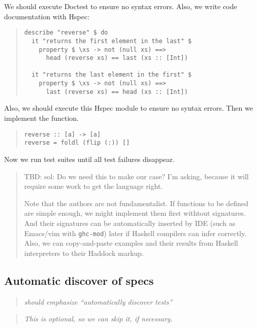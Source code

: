 \documentclass[preprint]{sigplanconf}
\begin{document}
\noindent We should execute Doctest to ensure no syntax errors.
Also, we write code documentation with Hspec:

\begin{quote}
\small
\begin{verbatim}
describe "reverse" $ do
  it "returns the first element in the last" $
    property $ \xs -> not (null xs) ==>
      head (reverse xs) == last (xs :: [Int])

  it "returns the last element in the first" $
    property $ \xs -> not (null xs) ==>
      last (reverse xs) == head (xs :: [Int])
\end{verbatim}
\end{quote}

\noindent Also, we should execute this Hspec module
to ensure no syntax errors.
Then we implement the function.

\begin{quote}
\small
\begin{verbatim}
reverse :: [a] -> [a]
reverse = foldl (flip (:)) []
\end{verbatim}
\end{quote}

\noindent Now we run test suites until
all test failures disappear.

\begin{quote}
    TBD: sol: Do we need this to make our case?  I'm asking, because
    it will require some work to get the language right.

    Note that the authors are not fundamentalist.  If functions to be
    defined are simple enough, we might implement them first withtout
    signatures.  And their signatures can be automatically inserted by
    IDE (such as Emacs/vim with {\tt ghc-mod}) later if Haskell
    compilers can infer correctly.  Also, we can copy-and-paste
    examples and their results from Haskell interpreters to their
    Haddock markup.
\end{quote}

\subsection{Automatic discover of specs}

\begin{quote}
    \emph{should emphasize ``automatically discover tests''}
\end{quote}

\begin{quote}
\emph{This is optional, so we can skip it, if necessary.}
\end{quote}
\end{document}

